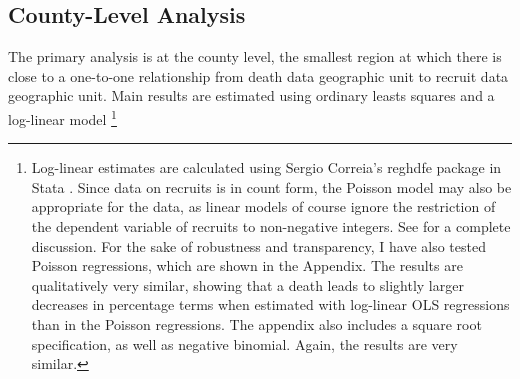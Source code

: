 \documentclass[12pt] {article}
\begin{document}
\subsection{County-Level Analysis\label{sub:County OLS}}

The primary analysis is at the county level, the smallest region at which there is close to a one-to-one relationship from death data geographic unit to recruit data geographic unit. Main results are estimated using ordinary leasts squares and a log-linear model \footnote{Log-linear estimates are calculated using Sergio Correia's reghdfe package in Stata \citep{reghdfe}. Since data on recruits is in count form, the Poisson model may also be appropriate for the data, as linear models of course ignore the restriction of the dependent variable of recruits to non-negative integers. See \cite{cameron2013countdata} for a complete discussion. For the sake of robustness and transparency, I have also tested Poisson regressions, which are shown in the Appendix. The results are qualitatively very similar, showing that a death leads to slightly larger decreases in percentage terms when estimated with log-linear OLS regressions than in the Poisson regressions. The appendix also includes a square root specification, as well as negative binomial. Again, the results are very similar.} 

\begin{table}
\caption{}
\label{Flo:loglinear}
\scalebox{0.9}{

}
\end{table}
\end{document}
